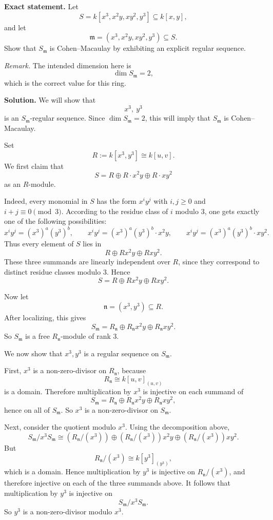 \documentclass[12pt,a4paper]{article}
\theoremstyle{notespace}
\begin{document}
\textbf{Exact statement.}
Let
\[
S=k[x^3,x^2y,xy^2,y^3]\subseteq k[x,y],
\]
and let
\[
\mathfrak m=(x^3,x^2y,xy^2,y^3)\subseteq S.
\]
Show that \(S_{\mathfrak m}\) is Cohen--Macaulay by exhibiting an explicit regular sequence.

\medskip

\textit{Remark.} The intended dimension here is
\[
\dim S_{\mathfrak m}=2,
\]
which is the correct value for this ring.

\textbf{Solution.}
We will show that
\[
x^3,\ y^3
\]
is an \(S_{\mathfrak m}\)-regular sequence. Since \(\dim S_{\mathfrak m}=2\), this will imply that \(S_{\mathfrak m}\) is Cohen--Macaulay.

\medskip

Set
\[
R:=k[x^3,y^3]\cong k[u,v].
\]
We first claim that
\[
S=R\oplus R\cdot x^2y \oplus R\cdot xy^2
\]
as an \(R\)-module.

Indeed, every monomial in \(S\) has the form \(x^i y^j\) with \(i,j\ge 0\) and \(i+j\equiv 0\pmod 3\). According to the residue class of \(i\) modulo \(3\), one gets exactly one of the following possibilities:
\[
x^i y^j=(x^3)^a(y^3)^b,
\qquad
x^i y^j=(x^3)^a(y^3)^b\cdot x^2y,
\qquad
x^i y^j=(x^3)^a(y^3)^b\cdot xy^2.
\]
Thus every element of \(S\) lies in
\[
R\oplus R x^2y \oplus R xy^2.
\]
These three summands are linearly independent over \(R\), since they correspond to distinct residue classes modulo \(3\). Hence
\[
S=R\oplus R x^2y \oplus R xy^2.
\]

Now let
\[
\mathfrak n=(x^3,y^3)\subseteq R.
\]
After localizing, this gives
\[
S_{\mathfrak m}
=
R_{\mathfrak n}\oplus R_{\mathfrak n}x^2y \oplus R_{\mathfrak n}xy^2.
\]
So \(S_{\mathfrak m}\) is a free \(R_{\mathfrak n}\)-module of rank \(3\).

\medskip

We now show that \(x^3,y^3\) is a regular sequence on \(S_{\mathfrak m}\).

First, \(x^3\) is a non-zero-divisor on \(R_{\mathfrak n}\), because
\[
R_{\mathfrak n}\cong k[u,v]_{(u,v)}
\]
is a domain. Therefore multiplication by \(x^3\) is injective on each summand of
\[
S_{\mathfrak m}
=
R_{\mathfrak n}\oplus R_{\mathfrak n}x^2y \oplus R_{\mathfrak n}xy^2,
\]
hence on all of \(S_{\mathfrak m}\). So \(x^3\) is a non-zero-divisor on \(S_{\mathfrak m}\).

Next, consider the quotient modulo \(x^3\). Using the decomposition above,
\[
S_{\mathfrak m}/x^3S_{\mathfrak m}
\cong
(R_{\mathfrak n}/(x^3)) \oplus (R_{\mathfrak n}/(x^3))x^2y \oplus (R_{\mathfrak n}/(x^3))xy^2.
\]
But
\[
R_{\mathfrak n}/(x^3)
\cong
k[y^3]_{(y^3)},
\]
which is a domain. Hence multiplication by \(y^3\) is injective on \(R_{\mathfrak n}/(x^3)\), and therefore injective on each of the three summands above. It follows that multiplication by \(y^3\) is injective on
\[
S_{\mathfrak m}/x^3S_{\mathfrak m}.
\]
So \(y^3\) is a non-zero-divisor modulo \(x^3\).
\end{document}
